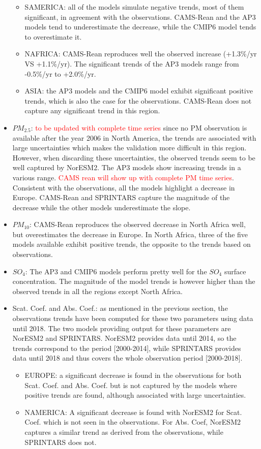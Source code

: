 \documentclass[journal abbreviation, manuscript]{copernicus}
\begin{document}
\begin{itemize}
\begin{itemize}
        \item SAMERICA: all of the models simulate negative trends, most of them significant, in agreement with the observations. CAMS-Rean and the AP3 models tend to underestimate the decrease, while the CMIP6 model tends to overestimate it.
        \item NAFRICA: CAMS-Rean reproduces well the observed increase (+1.3\%/yr VS +1.1\%/yr). The significant trends of the AP3 models range from -0.5\%/yr to +2.0\%/yr.
        \item ASIA: the AP3 models and the CMIP6 model exhibit significant positive trends, which is also the case for the observations. CAMS-Rean does not capture any significant trend in this region.
       \end{itemize}
 \item $PM_{2.5}$: \textcolor{red}{to be updated with complete time series} since no PM observation is available after the year 2006 in North America, the trends are associated with large uncertainties which makes the validation more difficult in this region. However, when discarding these uncertainties, the observed trends seem to be well captured by NorESM2. The AP3 models show increasing trends in a various range. \textcolor{red}{CAMS rean will show up with complete PM time series}. Consistent with the observations, all the models highlight a decrease in Europe. CAMS-Rean and SPRINTARS capture the magnitude of the decrease while the other models underestimate the slope.
 \item $PM_{10}$: CAMS-Rean reproduces the observed decrease in North Africa well, but overestimates the decrease in Europe. In North Africa, three of the five models available exhibit positive trends, the opposite to the trends based on observations.
 \item $SO_{4}$: The AP3 and CMIP6 models perform pretty well for the $SO_{4}$ surface concentration. The magnitude of the model trends is however higher than the observed trends in all the regions except North Africa.
 \item Scat. Coef. and Abs. Coef.:  as mentioned in the previous section, the observations trends have been computed for these two parameters using data until 2018. The two models providing output for these parameters are NorESM2 and SPRINTARS. NorESM2 provides data until 2014, so the trends correspond to the period [2000-2014], while SPRINTARS provides data until 2018 and thus covers the whole observation period [2000-2018].
       \begin{itemize}
        \item EUROPE: a significant decrease is found in the observations for both Scat. Coef. and Abs. Coef. but is not captured by the models where positive trends are found, although associated with large uncertainties.
        \item NAMERICA: A significant decrease is found with NorESM2 for Scat. Coef. which is not seen in the observations. For Abs. Coef, NorESM2 captures a similar trend as derived from the observations, while SPRINTARS does not.
       \end{itemize}
\end{itemize}
\end{document}

